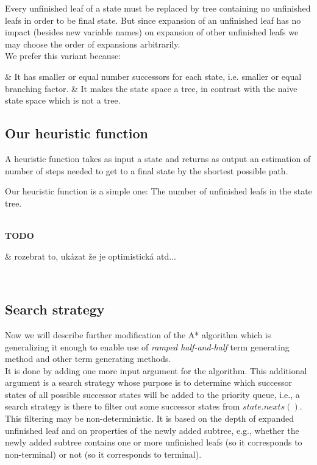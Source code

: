 \documentclass[12pt,a4paper]{report}
\newenvironment{enum}
{\begin{easylist}[itemize]}
{\end{easylist}}
\newenvironment{todo}
{ ~\\[0.5em]
  {\color{red}\textbf{TODO}}
  \begin{easylist}[itemize]}
{ \end{easylist}
  ~}
\begin{document}
Every unfinished leaf of a state must be replaced by 
tree containing no unfinished leafs in order to be final state. 
But since expansion of an unfinished leaf has no impact 
(besides new variable names) on expansion of other unfinished
leafs we may choose the order of expansions arbitrarily. \\

We prefer this variant because:
 \begin{enum}
 	& It has smaller or equal number successors for each state, 
 	  i.e. smaller or equal branching factor.
 	& It makes the state space a tree, in contrast with
 	  the naive state space which is not a tree. 
 \end{enum}

 



\subsection{Our heuristic function}

A heuristic function takes as input a state and returns as output an estimation of number
of steps needed to get to a final state by the shortest possible path.

Our heuristic function is a simple one: The number of unfinished leafs in the state tree.


\begin{todo}
& rozebrat to, ukázat že je optimistická atd...
\end{todo}

\subsection{Search strategy}

Now we will describe further modification of the A* algorithm 
which is generalizing it enough to enable use of \textit{ramped half-and-half}
term generating method and other term generating methods.\\


It is done by adding one more input argument for the algorithm.
This additional argument is a search strategy whose purpose is
to determine which successor states of all possible successor states 
will be added to the priority queue, i.e., a search strategy 
is there to filter out some successor states from $state.nexts()$.
This filtering may be non-deterministic. It is based on
the depth of expanded unfinished leaf and on properties of 
the newly added subtree, e.g., whether the newly added subtree
contains one or more unfinished leafs (so it corresponds to non-terminal) 
or not (so it corresponds to terminal). 
\end{document}

